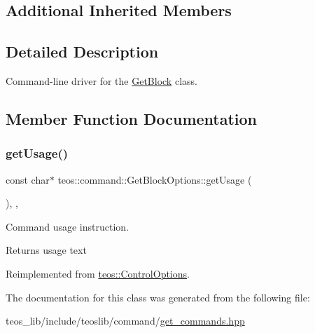 \subsection*{Additional Inherited Members}


\subsection{Detailed Description}
Command-\/line driver for the \mbox{\hyperlink{classteos_1_1command_1_1_get_block}{Get\+Block}} class. 

\subsection{Member Function Documentation}
\mbox{\label{classteos_1_1command_1_1_get_block_options_a85970d4f6337e594d2ac0756f67c50f7}} 
\subsubsection{\texorpdfstring{get\+Usage()}{getUsage()}}
{\footnotesize\ttfamily const char$\ast$ teos\+::command\+::\+Get\+Block\+Options\+::get\+Usage (\begin{DoxyParamCaption}{ }\end{DoxyParamCaption})\hspace{0.3cm}{\ttfamily [inline]}, {\ttfamily [protected]}, {\ttfamily [virtual]}}



Command \textquotesingle{}usage\textquotesingle{} instruction. 

\begin{DoxyReturn}{Returns}
usage text 
\end{DoxyReturn}


Reimplemented from \mbox{\hyperlink{classteos_1_1_control_options_a0aa5671f9bc750ed5280c26c543874f3}{teos\+::\+Control\+Options}}.



The documentation for this class was generated from the following file\+:\begin{DoxyCompactItemize}
\item 
teos\+\_\+lib/include/teoslib/command/\mbox{\hyperlink{get__commands_8hpp}{get\+\_\+commands.\+hpp}}\end{DoxyCompactItemize}
